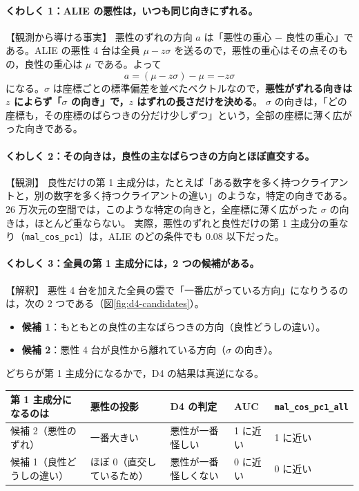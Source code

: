 \documentclass[a4j, dvipdfmx]{jsarticle}  %
\begin{document}
\paragraph{くわしく 1：ALIE の悪性は，いつも同じ向きにずれる。}【観測から導ける事実】
悪性のずれの方向 $a$ は「悪性の重心 $-$ 良性の重心」である。ALIE の悪性 4 台は全員 $\mu - z\sigma$ を送るので，悪性の重心はその点そのもの，良性の重心は $\mu$ である。よって
\begin{equation*}
  a = (\mu - z\sigma) - \mu = -z\sigma
\end{equation*}
になる。$\sigma$ は座標ごとの標準偏差を並べたベクトルなので，\textbf{悪性がずれる向きは $z$ によらず「$\sigma$ の向き」で，$z$ はずれの長さだけを決める}。
$\sigma$ の向きは，「どの座標も，その座標のばらつきの分だけ少しずつ」という，全部の座標に薄く広がった向きである。

\paragraph{くわしく 2：その向きは，良性の主なばらつきの方向とほぼ直交する。}【観測】
良性だけの第 1 主成分は，たとえば「ある数字を多く持つクライアントと，別の数字を多く持つクライアントの違い」のような，特定の向きである。
26 万次元の空間では，このような特定の向きと，全座標に薄く広がった $\sigma$ の向きは，ほとんど重ならない。
実際，悪性のずれと良性だけの第 1 主成分の重なり（\texttt{mal\_cos\_pc1}）は，ALIE のどの条件でも 0.08 以下だった。

\paragraph{くわしく 3：全員の第 1 主成分には，2 つの候補がある。}【解釈】
悪性 4 台を加えた全員の雲で「一番広がっている方向」になりうるのは，次の 2 つである（図\ref{fig:d4-candidates}）。
\begin{itemize}
  \item \textbf{候補 1}：もともとの良性の主なばらつきの方向（良性どうしの違い）。
  \item \textbf{候補 2}：悪性 4 台が良性から離れている方向（$\sigma$ の向き）。
\end{itemize}
どちらが第 1 主成分になるかで，D4 の結果は真逆になる。

\begin{table}[H]
\centering
\small
\begin{tabular}{@{}P{3.6cm} P{3.2cm} P{3.0cm} P{2.2cm} P{2.8cm}@{}}
\toprule
第 1 主成分になるのは & 悪性の投影 & D4 の判定 & AUC & \texttt{mal\_cos\_pc1\_all} \\
\midrule
候補 2（悪性のずれ） & 一番大きい & 悪性が一番怪しい & 1 に近い & 1 に近い \\
候補 1（良性どうしの違い） & ほぼ 0（直交しているため） & 悪性が一番怪しくない & 0 に近い & 0 に近い \\
\bottomrule
\end{tabular}
\end{table}
\end{document}
